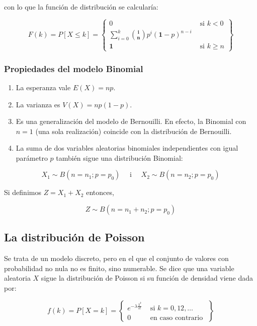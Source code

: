 \documentclass[
  a4paper,
  DIV=11,
  numbers=noendperiod]{scrreprt}
\providecommand{\tightlist}{%
  \setlength{\itemsep}{0pt}\setlength{\parskip}{0pt}}\usepackage{longtable,booktabs,array}
\begin{document}
con lo que la función de distribución se calcularía:

\[
F(k)=P[X \leq k]=\left\{\begin{array}{cc}
0 & \text { si } k<0 \\
\sum_{i=0}^{k}\binom{\mathbf{i}}{\mathbf{n}} p^{i}(\mathbf{1}-p)^{n-i} \\
\mathbf{1} & \text { si } k \geq n
\end{array}\right\}
\]

\subsubsection{Propiedades del modelo
Binomial}\label{propiedades-del-modelo-binomial}

\begin{enumerate}
\def\labelenumi{\arabic{enumi}.}
\tightlist
\item
  La esperanza vale \(E(X)=n p\).
\item
  La varianza es \(V(X)=n p(1-p)\).
\item
  Es una generalización del modelo de Bernouilli. En efecto, la Binomial
  con \(n=1\) (una sola realización) coincide con la distribución de
  Bernouilli.
\item
  La suma de dos variables aleatorias binomiales independientes con
  igual parámetro \(p\) también sigue una distribución Binomial:
\end{enumerate}

\[
X_{1} \sim B\left(n=n_{1} ; p=p_{0}\right) \quad \text { i } \quad X_{2} \sim B\left(n=n_{2} ; p=p_{0}\right)
\]

Si definimos \(Z=X_{1}+X_{2}\) entonces,

\[
Z \sim B\left(n=n_{1}+n_{2} ; p=p_{0}\right)
\]

\subsection{La distribución de
Poisson}\label{la-distribuciuxf3n-de-poisson}

Se trata de un modelo discreto, pero en el que el conjunto de valores
con probabilidad no nula no es finito, sino numerable. Se dice que una
variable aleatoria \(X\) sigue la distribución de Poisson si su función
de densidad viene dada por:

\[
f(k)=P[X=k]=\left\{\begin{array}{ll}
e^{-\lambda \frac{\lambda^{k}}{k!}} & \text { si } k=0,12, \ldots \\
0 & \text { en caso contrario }
\end{array}\right\}
\]
\end{document}
